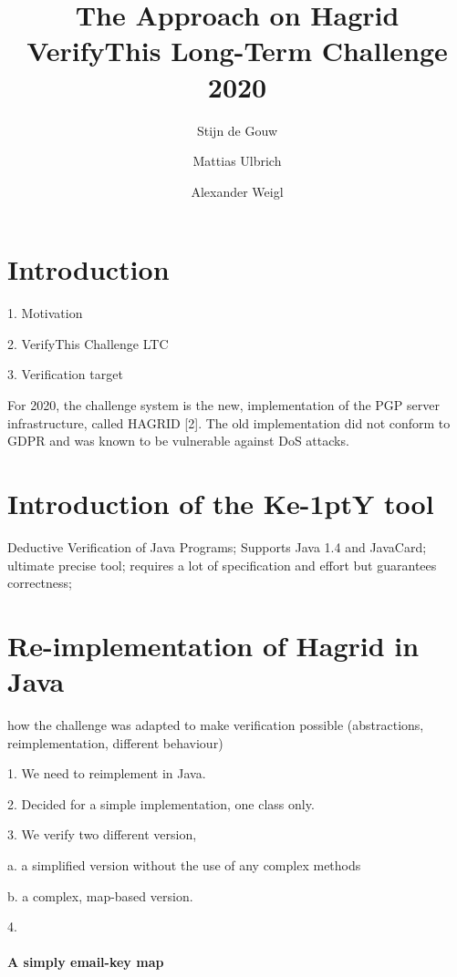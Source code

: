 \documentclass{llncs}
\title{The \KeY Approach on Hagrid
  \\{\small VerifyThis Long-Term Challenge 2020 }}
\author{ Stijn de Gouw \and Mattias Ulbrich \and Alexander Weigl }
\institute{Open University \and Karlsruhe Institute of Technology}
\newcommand{\KeY}{Ke\kern-1ptY\xspace}
\begin{document}
\maketitle

\section{Introduction}

1. Motivation

2. VerifyThis Challenge LTC

3. Verification target 

For 2020, the challenge system is the new, implementation of the PGP server
infrastructure, called HAGRID [2]. The old implementation did not conform to
GDPR and was known to be vulnerable against DoS attacks.
    


\section{Introduction of the \KeY tool}

Deductive Verification of Java Programs; Supports Java 1.4 and JavaCard;
ultimate precise tool; requires a lot of specification and effort but guarantees
correctness;


\section{Re-implementation of Hagrid in Java}

how the challenge was adapted to make verification possible
(abstractions, reimplementation, different behaviour)

1. We need to reimplement in Java.

2. Decided for a simple implementation, one class only.

3. We verify two different version,

a. a simplified version without the use of any complex methods

b. a complex, map-based version.

4. 

\paragraph{A simply email-key map}
\end{document}
